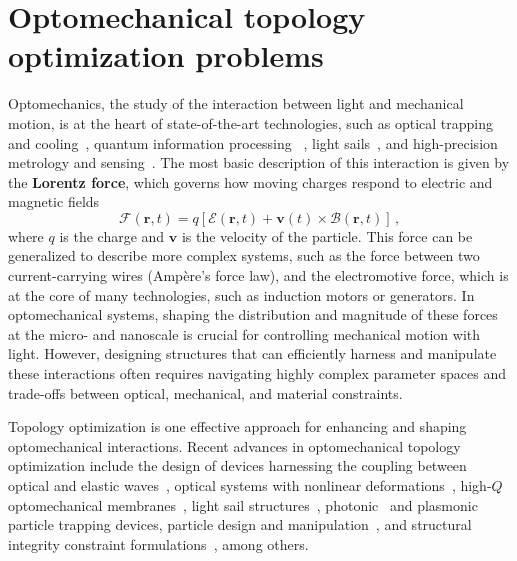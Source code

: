 \chapter{Optomechanical topology optimization problems}\label{chap:om}
Optomechanics, the study of the interaction between light and mechanical motion, is at the heart of state-of-the-art technologies, such as 
optical trapping~\cite{ashkin_acceleration_1970, moffitt_recent_2008} and cooling~\cite{cooling}, quantum information processing~\cite{Andrews_2014, Xi_2025}
, light sails~\cite{lightsail, lightsail1}, and high-precision metrology and sensing~\cite{sensing, weakforce, Li:18, Mason_2019}. The most basic description of this interaction is given by the \textbf{Lorentz force}, which governs how moving charges respond to electric and magnetic fields
\begin{equation}\label{eq:lorentz_f}
 \mathbf{\bm{\mathcal{F}}}(\mathbf{r},t) = q \left[ \bm{\mathcal{E}}(\mathbf{r},t) + \mathbf{v}(t) \times \bm{\mathcal{B}}(\mathbf{r},t) \right]\,,
\end{equation}
where $q$ is the charge and $\mathbf{v}$ is the velocity of the particle. This force can be generalized to describe more complex systems,
such as the force between two current-carrying 
wires (Ampère's force law), and the electromotive force, which is at the core of many technologies, such as induction motors or generators.
In optomechanical systems, shaping the distribution and magnitude of these forces at the micro- and nanoscale is crucial for controlling mechanical motion with light. 
However, designing structures that can efficiently harness and manipulate these interactions often requires navigating highly complex
 parameter spaces and trade-offs between optical, mechanical, and material constraints.

 Topology optimization is one effective approach for enhancing and shaping optomechanical interactions.
Recent advances in optomechanical topology optimization include the design of devices harnessing the coupling between optical and elastic
 waves~\cite{photo_topopt}, optical systems with nonlinear deformations~\cite{def_wg}, high-$Q$ optomechanical membranes~\cite{highQ1, fengwen, aragon1},
light sail structures~\cite{lightsail_topopt, lightsail_topopt1},
photonic~\cite{ownpub1} and plasmonic~\cite{nelson_inverse_2024} particle trapping devices, particle design and manipulation~\cite{ownpub2, particle_opt},
and structural integrity constraint formulations~\cite{structural_integrity},
 among others.

